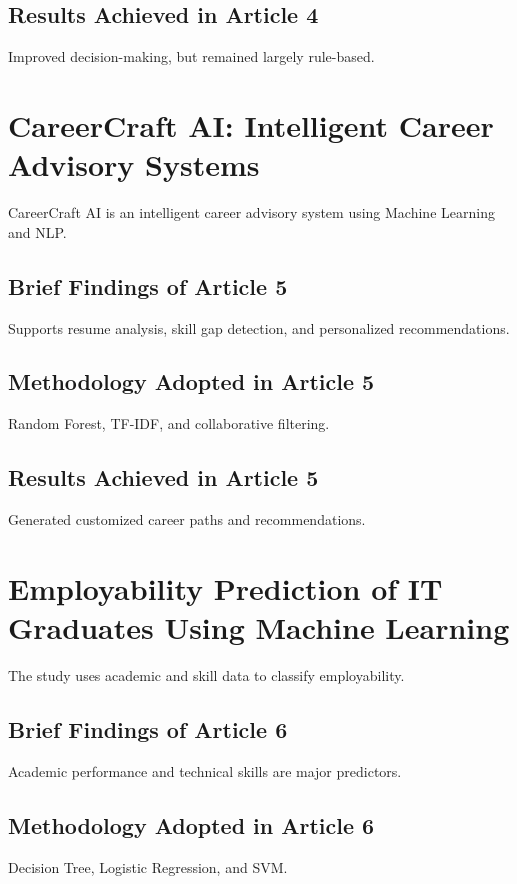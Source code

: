 \documentclass[12pt,a4paper]{report}
\begin{document}
\subsection{Results Achieved in Article 4}
Improved decision-making, but remained largely rule-based.

\section{CareerCraft AI: Intelligent Career Advisory Systems}
\cite{talekar2025careercraft}
\par
CareerCraft AI is an intelligent career advisory system using Machine Learning and NLP.

\subsection{Brief Findings of Article 5}
Supports resume analysis, skill gap detection, and personalized recommendations.

\subsection{Methodology Adopted in Article 5}
Random Forest, TF-IDF, and collaborative filtering.

\subsection{Results Achieved in Article 5}
Generated customized career paths and recommendations.

\section{Employability Prediction of IT Graduates Using Machine Learning}
\cite{elsharkawy2022employability}
\par
The study uses academic and skill data to classify employability.

\subsection{Brief Findings of Article 6}
Academic performance and technical skills are major predictors.

\subsection{Methodology Adopted in Article 6}
Decision Tree, Logistic Regression, and SVM.
\end{document}
